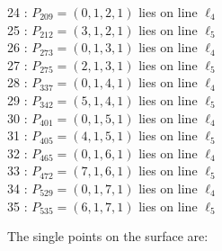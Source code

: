 \documentclass{article}
\begin{document}
{\begin{multicols}{2}
24 : $P_{209}=( 0, 1, 2, 1 )$ lies on line $\ell_{4}$\\
25 : $P_{212}=( 3, 1, 2, 1 )$ lies on line $\ell_{5}$\\
26 : $P_{273}=( 0, 1, 3, 1 )$ lies on line $\ell_{4}$\\
27 : $P_{275}=( 2, 1, 3, 1 )$ lies on line $\ell_{5}$\\
28 : $P_{337}=( 0, 1, 4, 1 )$ lies on line $\ell_{4}$\\
29 : $P_{342}=( 5, 1, 4, 1 )$ lies on line $\ell_{5}$\\
30 : $P_{401}=( 0, 1, 5, 1 )$ lies on line $\ell_{4}$\\
31 : $P_{405}=( 4, 1, 5, 1 )$ lies on line $\ell_{5}$\\
32 : $P_{465}=( 0, 1, 6, 1 )$ lies on line $\ell_{4}$\\
33 : $P_{472}=( 7, 1, 6, 1 )$ lies on line $\ell_{5}$\\
34 : $P_{529}=( 0, 1, 7, 1 )$ lies on line $\ell_{4}$\\
35 : $P_{535}=( 6, 1, 7, 1 )$ lies on line $\ell_{5}$\\
\end{multicols}
The single points on the surface are:\\
}
\end{document}
